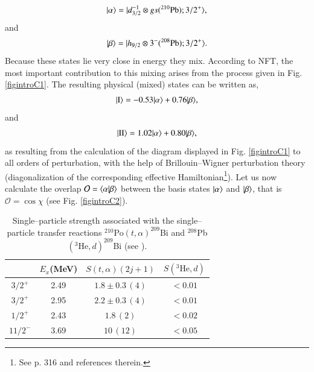 \begin{align}\label{eqintroC1}
|{\alpha} \rangle=|{d_{3/2}^{-1}\otimes gs (^{210}\text{Pb});3/2^+} \rangle,
\end{align}
and 
\begin{align}\label{eqintroC2}
|{\beta} \rangle=|{h_{9/2}\otimes 3^- (^{208}\text{Pb});3/2^+} \rangle.
\end{align}
Because these states lie very close in energy they mix. According to NFT, the most important contribution to this mixing arises from the process given in Fig. \ref{figintroC1}. The resulting physical (mixed) states can be  written as,
\begin{align}\label{eqintroC3}
|{\text{I}} \rangle=-0.53 |{\alpha} \rangle + 0.76 |{\beta} \rangle,
\end{align}
and 
\begin{align}\label{eqintroC4}
|{\text{II}} \rangle=1.02 |{\alpha} \rangle + 0.80 |{\beta} \rangle,
\end{align}
as resulting from the calculation of the diagram displayed in Fig. \ref{figintroC1} to all orders of perturbation, with the help of Brillouin--Wigner perturbation theory (diagonalization of the corresponding effective Hamiltonian\footnote{See p. 316 \cite{Bortignon:77} and references therein.}). Let us now calculate the overlap $\mathcal O=\langle {\alpha|\beta} \rangle$ between the basis states $|{\alpha} \rangle$ and $|{\beta} \rangle$, that is $\mathcal O=\cos\chi$ (see Fig. \ref{figintroC2}).   
\begin{table}
\begin{tabular}{|c|c|c|c|}
\hline 
 & $E_x$(MeV) & $S(t,\alpha)(2j+1)$ & $S(^3\text{He},d)$ \\
 \hline 
$3/2^+$ & 2.49 & $1.8\pm0.3\,(4)$  & $<0.01$  \\ 
$3/2^+$ & 2.95 & $2.2\pm0.3\,(4)$  & $<0.01$ \\ 
 $1/2^+$& 2.43 &  $1.8\,(2)$& $<0.02$ \\ 
 $11/2^-$& 3.69 & $10\,(12)$ &  $<0.05$\\ 
 \hline
\end{tabular}\caption{Single--particle strength associated with the single--particle transfer reactions  $^{210}$Po$(t,\alpha)^{209}$Bi and $^{208}$Pb$(^3\text{He},d)^{209}$Bi (see \cite{Bortignon:77}).}\label{tabintroC1}
\end{table}
